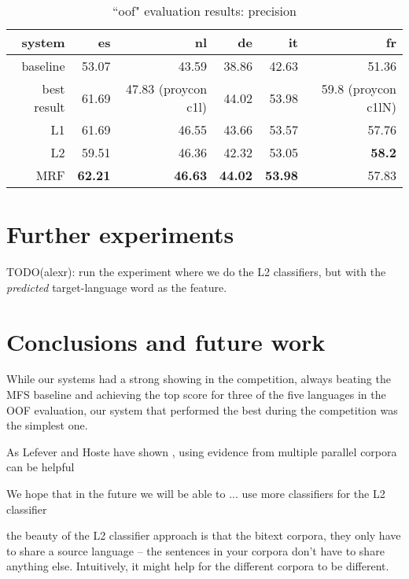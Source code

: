 \documentclass[11pt,letterpaper]{article}
\begin{document}
\begin{table*}[t!]
  \begin{center}
    \begin{tabular}{|r|r|r|r|r|r|}
      \hline
      system   & es    & nl    & de    &  it   & fr \\
      \hline
      baseline & 53.07          & 43.59              & 38.86          & 42.63          & 51.36 \\
   best result & 61.69          & 47.83 (proycon c1l)& 44.02          & 53.98          & 59.8 (proycon c1lN) \\
           L1  & 61.69          & 46.55              & 43.66          & 53.57          & 57.76 \\
           L2  & 59.51          & 46.36              & 42.32          & 53.05          & \textbf{58.2} \\
           MRF & \textbf{62.21} & \textbf{46.63}     & \textbf{44.02} & \textbf{53.98} & 57.83 \\
      \hline
    \end{tabular}
  \caption{``oof" evaluation results: precision}
  \label{table:resultsbest}
  \end{center}
\end{table*}


\section{Further experiments}
TODO(alexr): run the experiment where we do the L2 classifiers, but with the
\emph{predicted} target-language word as the feature.

\section{Conclusions and future work}
While our systems had a strong showing in the competition, always beating the
MFS baseline and achieving the top score for three of the five languages in the
OOF evaluation, our system that performed the best during the competition was
the simplest one.

As Lefever and Hoste have shown \cite{lefever-hoste-decock:2011:ACL-HLT2011},
using evidence from multiple parallel corpora can be helpful 

We hope that in the future we will be able to ...
 use more classifiers for the L2 classifier

 the beauty of the L2 classifier approach is that the bitext corpora, they
only have to share a source language -- the sentences in your corpora don't
have to share anything else. Intuitively, it might help for the different
corpora to be different.
\end{document}
